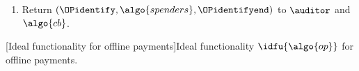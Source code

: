 \begin{framed}
\begin{enumerate}
\begin{enumerate}
\begin{enumerate}
		  \item Fetch $\algo{tokens}[\vec{\algo{id}}_{ij}] \rightarrow
\langle \algo{usr}_{ij}, v\rangle$.

		  \item Set $\algo{spenders} \gets \algo{spenders} \cup \algo{usr}_{ij}$.

		\end{enumerate}

	      \item Return $(\OPidentify, \algo{spenders}, \OPidentifyend)$ to
$\auditor$ and $\algo{cb}$.

	    \end{enumerate}

	\end{enumerate}

    \end{framed}

[Ideal functionality for offline payments]{Ideal functionality $\idfu{\algo{op}}$ for offline payments.}\label{fig:ideal-func}
\endgroup
